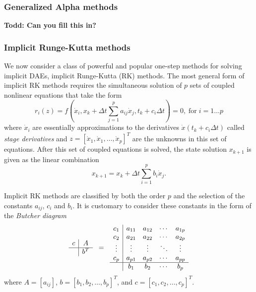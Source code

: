 \documentclass[pdf,ps2pdf,11pt]{SANDreport}
\begin{document}
\subsubsection{Generalized Alpha methods}

\cite{GeneralizedAlpha}
{}\textbf{Todd: Can you fill this in?}

\subsubsection{Implicit Runge-Kutta methods}

We now consider a class of powerful and popular one-step methods for solving
implicit DAEs, implicit Runge-Kutta (RK) methods.  The most general form
of implicit RK methods requires the simultaneous solution of $p$ sets
of coupled nonlinear equations that take the form
%
\begin{equation}
r_i(z) = f\left( \dot{x}_i, x_k + \Delta t \sum_{j=1}^{p} a_{ij} \dot{x}_j,
t_k + c_i \Delta t \right) = 0,
\; \mbox{for} \; i = 1 \ldots p
\label{rythmos:eqn:irk_dae_ne}
\end{equation}
%
where $\dot{x}_i$ are essentially approximations to the derivatives
$\dot{x}(t_k + c_i \Delta t)$ called {}\textit{stage derivatives} and $z = [
{}\dot{x}_1, {}\dot{x}_1, {}\ldots, {}\dot{x}_p ]^T$ are the unknowns in this
set of equations.  After this set of coupled equations is solved, the state
solution $x_{k+1}$ is given as the linear combination
%
\begin{equation}
x_{k+1} = x_k + \Delta t \sum_{i=1}^{p} b_i \dot{x}_j.
\end{equation}

Implicit RK methods are classified by both the order $p$ and the selection of
the constants $a_{ij}$, $c_i$ and $b_i$.  It is customary to consider these
constants in the form of the {}\textit{Butcher diagram}
%
\[
\begin{array}{c|c}
c & A \\
\hline
  & b^T
\end{array}
\; \; = \; \;
\begin{array}{c|cccc}
c_1 & a_{11} & a_{12} & \cdots & a_{1p} \\
c_2 & a_{21} & a_{22} & \cdots & a_{2p} \\
\vdots & \vdots & \vdots & \ddots & \vdots \\
c_p & a_{p1} & a_{p2} & \cdots & a_{pp} \\
\hline
 & b_1 & b_2 & \cdots & b_p
\end{array}
\]
%
where $A = [a_{ij}]$, $b = [b_1, b_2, {}\ldots, b_p]^T$, and $c =
[c_1, c_2, {}\ldots, c_p]^T$.
\end{document}
